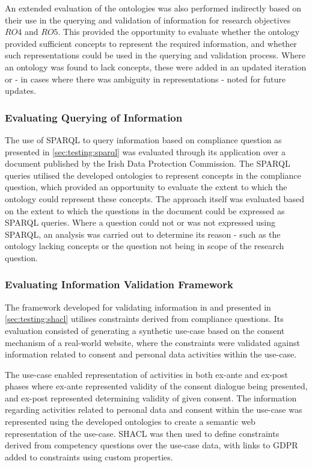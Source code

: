 An extended evaluation of the ontologies was also performed indirectly based on their use in the querying and validation of information for research objectives $RO4$ and $RO5$. This provided the opportunity to evaluate whether the ontology provided sufficient concepts to represent the required information, and whether such representations could be used in the querying and validation process.
Where an ontology was found to lack concepts, these were added in an updated iteration or - in cases where there was ambiguity in representations - noted for future updates.

\subsubsection{Evaluating Querying of Information}
The use of SPARQL to query information based on compliance question as presented in \autoref{sec:testing:sparql} was evaluated through its application over a document published by the Irish Data Protection Commission.
The SPARQL queries utilised the developed ontologies to represent concepts in the compliance question, which provided an opportunity to evaluate the extent to which the ontology could represent these concepts.
The approach itself was evaluated based on the extent to which the questions in the document could be expressed as SPARQL queries.
Where a question could not or was not expressed using SPARQL, an analysis was carried out to determine its reason - such as the ontology lacking concepts or the question not being in scope of the research question.

\subsubsection{Evaluating Information Validation Framework}
The framework developed for validating information in and presented in \autoref{sec:testing:shacl} utilises constraints derived from compliance questions.
Its evaluation consisted of generating a synthetic use-case based on the consent mechanism of a real-world website, where the constraints were validated against information related to consent and personal data activities within the use-case.

The use-case enabled representation of activities in both ex-ante and ex-post phases where ex-ante represented validity of the consent dialogue being presented, and ex-post represented determining validity of given consent.
The information regarding activities related to personal data and consent within the use-case was represented using the developed ontologies to create a semantic web representation of the use-case.
SHACL was then used to define constraints derived from competency questions over the use-case data, with links to GDPR added to constraints using custom properties.


